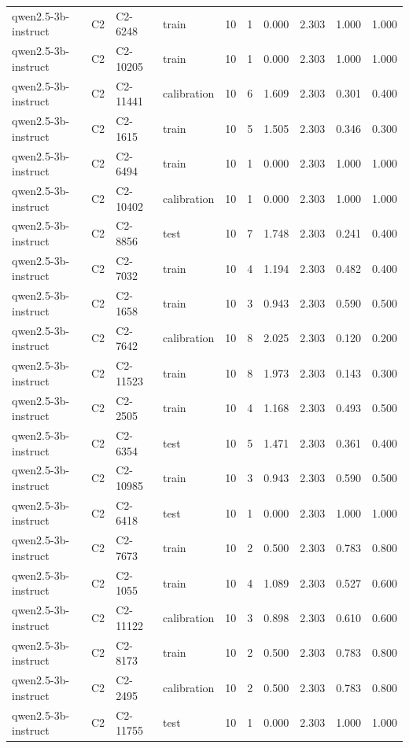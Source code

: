 \begin{table}
\begin{tabular}{llllrrrrrr}
qwen2.5-3b-instruct & C2 & C2-6248 & train & 10 & 1 & 0.000 & 2.303 & 1.000 & 1.000 \\
qwen2.5-3b-instruct & C2 & C2-10205 & train & 10 & 1 & 0.000 & 2.303 & 1.000 & 1.000 \\
qwen2.5-3b-instruct & C2 & C2-11441 & calibration & 10 & 6 & 1.609 & 2.303 & 0.301 & 0.400 \\
qwen2.5-3b-instruct & C2 & C2-1615 & train & 10 & 5 & 1.505 & 2.303 & 0.346 & 0.300 \\
qwen2.5-3b-instruct & C2 & C2-6494 & train & 10 & 1 & 0.000 & 2.303 & 1.000 & 1.000 \\
qwen2.5-3b-instruct & C2 & C2-10402 & calibration & 10 & 1 & 0.000 & 2.303 & 1.000 & 1.000 \\
qwen2.5-3b-instruct & C2 & C2-8856 & test & 10 & 7 & 1.748 & 2.303 & 0.241 & 0.400 \\
qwen2.5-3b-instruct & C2 & C2-7032 & train & 10 & 4 & 1.194 & 2.303 & 0.482 & 0.400 \\
qwen2.5-3b-instruct & C2 & C2-1658 & train & 10 & 3 & 0.943 & 2.303 & 0.590 & 0.500 \\
qwen2.5-3b-instruct & C2 & C2-7642 & calibration & 10 & 8 & 2.025 & 2.303 & 0.120 & 0.200 \\
qwen2.5-3b-instruct & C2 & C2-11523 & train & 10 & 8 & 1.973 & 2.303 & 0.143 & 0.300 \\
qwen2.5-3b-instruct & C2 & C2-2505 & train & 10 & 4 & 1.168 & 2.303 & 0.493 & 0.500 \\
qwen2.5-3b-instruct & C2 & C2-6354 & test & 10 & 5 & 1.471 & 2.303 & 0.361 & 0.400 \\
qwen2.5-3b-instruct & C2 & C2-10985 & train & 10 & 3 & 0.943 & 2.303 & 0.590 & 0.500 \\
qwen2.5-3b-instruct & C2 & C2-6418 & test & 10 & 1 & 0.000 & 2.303 & 1.000 & 1.000 \\
qwen2.5-3b-instruct & C2 & C2-7673 & train & 10 & 2 & 0.500 & 2.303 & 0.783 & 0.800 \\
qwen2.5-3b-instruct & C2 & C2-1055 & train & 10 & 4 & 1.089 & 2.303 & 0.527 & 0.600 \\
qwen2.5-3b-instruct & C2 & C2-11122 & calibration & 10 & 3 & 0.898 & 2.303 & 0.610 & 0.600 \\
qwen2.5-3b-instruct & C2 & C2-8173 & train & 10 & 2 & 0.500 & 2.303 & 0.783 & 0.800 \\
qwen2.5-3b-instruct & C2 & C2-2495 & calibration & 10 & 2 & 0.500 & 2.303 & 0.783 & 0.800 \\
qwen2.5-3b-instruct & C2 & C2-11755 & test & 10 & 1 & 0.000 & 2.303 & 1.000 & 1.000 \\

\end{tabular}
\end{table}
